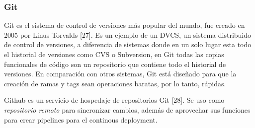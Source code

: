 \subsubsection{Git}
Git es el sistema de control de versiones más popular del mundo, fue creado en 2005 por Linus Torvalds [27]. Es un ejemplo de un DVCS, un sistema distribuido de control de versiones, a diferencia de sistemas donde en un solo lugar esta todo el historial de versiones como CVS o Subversion, en Git todas las copias funcionales de código son un repositorio que contiene todo el historial de versiones.
En comparación con otros sistemas, Git está diseñado para que la creación de ramas y tags sean operaciones baratas, por lo tanto, rápidas.

Github es un servicio de hospedaje de repositorios Git [28]. Se uso como \textit{repositorio remoto} para sincronizar cambios, además de aprovechar sus funciones para crear pipelines para el continous deployment.